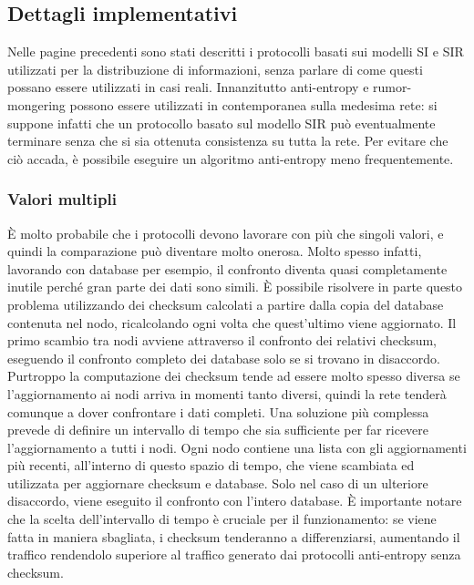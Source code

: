 \subsection{Dettagli implementativi}
\label{sec:00456}

Nelle pagine precedenti sono stati descritti i protocolli basati sui modelli SI e SIR utilizzati per la distribuzione di informazioni, senza parlare di come questi possano essere utilizzati in casi reali. Innanzitutto anti-entropy e rumor-mongering possono essere utilizzati in contemporanea sulla medesima rete: si suppone infatti che un protocollo basato sul modello SIR può eventualmente terminare senza che si sia ottenuta consistenza su tutta la rete. Per evitare che ciò accada, è possibile eseguire un algoritmo anti-entropy meno frequentemente.


\subsubsection{Valori multipli}

È molto probabile che i protocolli devono lavorare con più che singoli valori, e quindi la comparazione può diventare molto onerosa. Molto spesso infatti, lavorando con database per esempio, il confronto diventa quasi completamente inutile perché gran parte dei dati sono simili. È possibile risolvere in parte questo problema utilizzando dei checksum calcolati a partire dalla copia del database contenuta nel nodo, ricalcolando ogni volta che quest’ultimo viene aggiornato. Il primo scambio tra nodi avviene attraverso il confronto dei relativi checksum, eseguendo il confronto completo dei database solo se si trovano in disaccordo. Purtroppo la computazione dei checksum tende ad essere molto spesso diversa se l’aggiornamento ai nodi arriva in momenti tanto diversi, quindi la rete tenderà comunque a dover confrontare i dati completi. Una soluzione più complessa prevede di definire un intervallo di tempo che sia sufficiente per far ricevere l’aggiornamento a tutti i nodi. Ogni nodo contiene una lista con gli aggiornamenti più recenti, all’interno di questo spazio di tempo, che viene scambiata ed utilizzata per aggiornare checksum e database. Solo nel caso di un ulteriore disaccordo, viene eseguito il confronto con l’intero database. È importante notare che la scelta dell’intervallo di tempo è cruciale per il funzionamento: se viene fatta in maniera sbagliata, i checksum tenderanno a differenziarsi, aumentando il traffico rendendolo superiore al traffico generato dai protocolli anti-entropy senza checksum.

